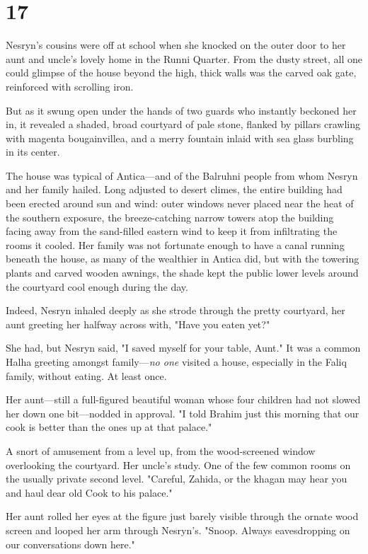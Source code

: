 
\chapter{17}

Nesryn's cousins were off at school when she knocked on the outer door to her aunt and uncle's lovely home in the Runni Quarter.
From the dusty street, all one could glimpse of the house beyond the high, thick walls was the carved oak gate, reinforced with scrolling iron.

But as it swung open under the hands of two guards who instantly beckoned her in, it revealed a shaded, broad courtyard of pale stone, flanked by pillars crawling with magenta bougainvillea, and a merry fountain inlaid with sea glass burbling in its center.

The house was typical of Antica---and of the Balruhni people from whom Nesryn and her family hailed.
Long adjusted to desert climes, the entire building had been erected around sun and wind: outer windows never placed near the heat of the southern exposure, the breeze-catching narrow towers atop the building facing away from the sand-filled eastern wind to keep it from infiltrating the rooms it cooled.
Her family was not fortunate enough to have a canal running beneath the house, as many of the wealthier in Antica did, but with the towering plants and carved wooden awnings, the shade kept the public lower levels around the courtyard cool enough during the day.

Indeed, Nesryn inhaled deeply as she strode through the pretty courtyard, her aunt greeting her halfway across with, "Have you eaten yet?"

She had, but Nesryn said, "I saved myself for your table, Aunt."
It was a common Halha greeting amongst family---\emph{no one} visited a house, especially in the Faliq family, without eating.
At least once.

Her aunt---still a full-figured beautiful woman whose four children had not slowed her down one bit---nodded in approval.
"I told Brahim just this morning that our cook is better than the ones up at that palace."

A snort of amusement from a level up, from the wood-screened window overlooking the courtyard.
Her uncle's study.
One of the few common rooms on the usually private second level.
"Careful, Zahida, or the khagan may hear you and haul dear old Cook to his palace."

Her aunt rolled her eyes at the figure just barely visible through the ornate wood screen and looped her arm through Nesryn's.
"Snoop.
Always eavesdropping on our conversations down here."

